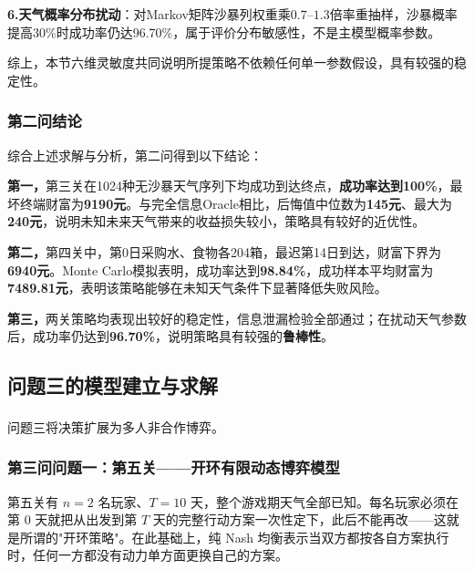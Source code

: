 \documentclass{cumcmthesis}
\numberwithin{equation}{section}
\numberwithin{figure}{section}
\numberwithin{table}{section}
\begin{document}
\textbf{6.天气概率分布扰动}：对Markov矩阵沙暴列权重乘$0.7$--$1.3$倍率重抽样，沙暴概率提高30\%时成功率仍达96.70\%，属于评价分布敏感性，不是主模型概率参数。

综上，本节六维灵敏度共同说明所提策略不依赖任何单一参数假设，具有较强的稳定性。
 \vspace{-10pt} 
\subsubsection{第二问结论}

综合上述求解与分析，第二问得到以下结论：

\textbf{第一，}第三关在1024种无沙暴天气序列下均成功到达终点，\textbf{成功率达到100\%}，最坏终端财富为\textbf{9190元}。与完全信息Oracle相比，后悔值中位数为\textbf{145元}、最大为\textbf{240元}，说明未知未来天气带来的收益损失较小，策略具有较好的近优性。

\textbf{第二，}第四关中，第0日采购水、食物各204箱，最迟第14日到达，财富下界为\textbf{6940元}。Monte Carlo模拟表明，成功率达到\textbf{98.84\%}，成功样本平均财富为\textbf{7489.81元}，表明该策略能够在未知天气条件下显著降低失败风险。

\textbf{第三，}两关策略均表现出较好的稳定性，信息泄漏检验全部通过；在扰动天气参数后，成功率仍达到\textbf{96.70\%}，说明策略具有较强的\textbf{鲁棒性}。
\vspace{-10pt} 
\subsection{问题三的模型建立与求解}

问题三将决策扩展为多人非合作博弈\textsuperscript{\cite{zhangtian2017}}。
 \vspace{-10pt} 
\subsubsection{第三问问题一：第五关——开环有限动态博弈模型}

第五关有 $n=2$ 名玩家、$T=10$ 天，整个游戏期天气全部已知。每名玩家必须在第 0 天就把从出发到第 $T$ 天的完整行动方案一次性定下，此后不能再改——这就是所谓的"开环策略"。在此基础上，纯 Nash 均衡表示当双方都按各自方案执行时，任何一方都没有动力单方面更换自己的方案。
\end{document}
